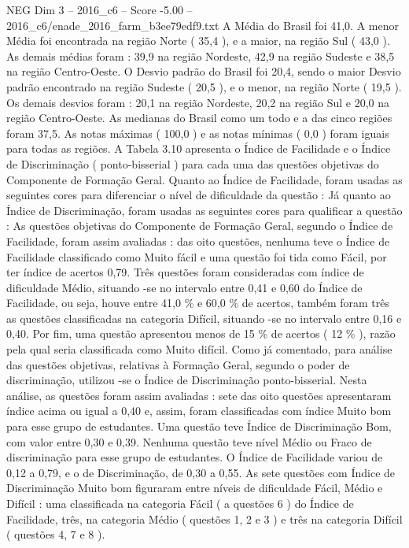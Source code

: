 \begin{textsample}{NEG Dim 3 – 2016\_c6 – Score -5.00 – 2016\_c6/enade\_2016\_farm\_b3ee79edf9.txt}
A Média do Brasil foi 41,0.
A menor Média foi encontrada na região Norte ( 35,4 ), e a maior, na região Sul ( 43,0 ).
As demais médias foram : 39,9 na região Nordeste, 42,9 na região Sudeste e 38,5 na região Centro-Oeste.
O Desvio padrão do Brasil foi 20,4, sendo o maior Desvio padrão encontrado na região Sudeste ( 20,5 ), e o menor, na região Norte ( 19,5 ).
Os demais desvios foram : 20,1 na região Nordeste, 20,2 na região Sul e 20,0 na região Centro-Oeste.
As medianas do Brasil como um todo e a das cinco regiões foram 37,5.
As notas máximas ( 100,0 ) e as notas mínimas ( 0,0 ) foram iguais para todas as regiões.
A Tabela 3.10 apresenta o Índice de Facilidade e o Índice de Discriminação ( ponto-bisserial ) para cada uma das questões objetivas do Componente de Formação Geral.
Quanto ao Índice de Facilidade, foram usadas as seguintes cores para diferenciar o nível de dificuldade da questão : Já quanto ao Índice de Discriminação, foram usadas as seguintes cores para qualificar a questão : As questões objetivas do Componente de Formação Geral, segundo o Índice de Facilidade, foram assim avaliadas : das oito questões, nenhuma teve o Índice de Facilidade classificado como Muito fácil e uma questão foi tida como Fácil, por ter índice de acertos 0,79.
Três questões foram consideradas com índice de dificuldade Médio, situando -se no intervalo entre 0,41 e 0,60 do Índice de Facilidade, ou seja, houve entre 41,0 \% e 60,0 \% de acertos, também foram três as questões classificadas na categoria Difícil, situando -se no intervalo entre 0,16 e 0,40.
Por fim, uma questão apresentou menos de 15 \% de acertos ( 12 \% ), razão pela qual seria classificada como Muito difícil.
Como já comentado, para análise das questões objetivas, relativas à Formação Geral, segundo o poder de discriminação, utilizou -se o Índice de Discriminação ponto-bisserial.
Nesta análise, as questões foram assim avaliadas : sete das oito questões apresentaram índice acima ou igual a 0,40 e, assim, foram classificadas com índice Muito bom para esse grupo de estudantes.
Uma questão teve Índice de Discriminação Bom, com valor entre 0,30 e 0,39.
Nenhuma questão teve nível Médio ou Fraco de discriminação para esse grupo de estudantes.
O Índice de Facilidade variou de 0,12 a 0,79, e o de Discriminação, de 0,30 a 0,55.
As sete questões com Índice de Discriminação Muito bom figuraram entre níveis de dificuldade Fácil, Médio e Difícil : uma classificada na categoria Fácil ( a questões 6 ) do Índice de Facilidade, três, na categoria Médio ( questões 1, 2 e 3 ) e três na categoria Difícil ( questões 4, 7 e 8 ).

\end{textsample}
